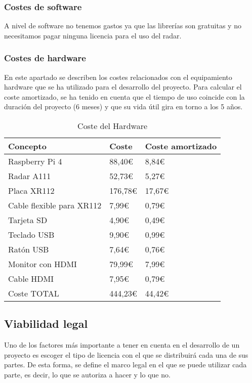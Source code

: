 \subsubsection{Costes de software}

A nivel de software no tenemos gastos ya que las librerías son gratuitas y no necesitamos pagar ninguna licencia para el uso del radar.

\subsubsection{Costes de hardware}

En este apartado se describen los costes relacionados con el equipamiento hardware que se ha utilizado para el desarrollo del proyecto. Para calcular el coste amortizado, se ha tenido en cuenta que el tiempo de uso coincide con la duración del proyecto (6 meses) y que su vida útil gira en torno a los 5 años.


\begin{table}[H]
	\centering
	\begin{tabular}{l|l|l}
		\toprule
		Concepto & Coste & Coste amortizado  \\
		\midrule
		Raspberry Pi 4  & 88,40€ & 8,84€ \\
  		Radar A111 & 52,73€ & 5,27€\\
  		Placa XR112 & 176,78€ & 17,67€\\
  		Cable flexible para XR112  & 7,99€ & 0,79€\\
  		Tarjeta SD  & 4,90€ & 0,49€\\
  		Teclado USB & 9,90€ & 0,99€\\
  		Ratón USB & 7,64€ & 0,76€\\
  		Monitor con HDMI & 79,99€ & 7,99€\\
  		Cable HDMI & 7,95€  & 0,79€\\
		\bottomrule
		Coste TOTAL & 444,23€ & 44,42€\\
	\end{tabular}
	\caption{Coste del Hardware}
	\label{tab:material}
\end{table}
 
\subsection{Viabilidad legal}

Uno de los factores más importante a tener en cuenta en el desarrollo de un proyecto es escoger el tipo de licencia con el que se distribuirá cada una de sus partes. De esta forma, se define el marco legal en el que se puede utilizar cada parte, es decir, lo que se autoriza a hacer y lo que no.

